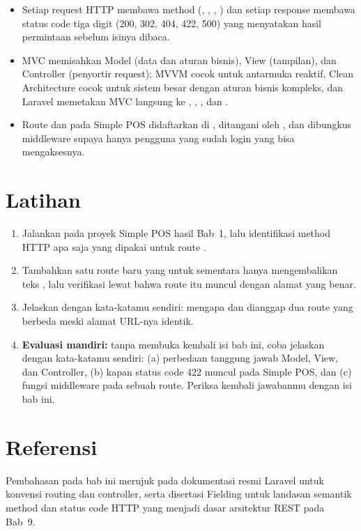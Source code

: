 \begin{itemize}
  \item Setiap request HTTP membawa method (, ,
    , ) dan setiap response membawa status code tiga
    digit (200, 302, 404, 422, 500) yang menyatakan hasil permintaan
    sebelum isinya dibaca.
  \item MVC memisahkan Model (data dan aturan bisnis), View (tampilan), dan
    Controller (penyortir request); MVVM cocok untuk antarmuka reaktif,
    Clean Architecture cocok untuk sistem besar dengan aturan bisnis
    kompleks, dan Laravel memetakan MVC langsung ke
    , , , dan
    .
  \item Route  dan  pada Simple POS
    didaftarkan di , ditangani oleh
    , dan dibungkus middleware 
    supaya hanya pengguna yang sudah login yang bisa mengaksesnya.
\end{itemize}

\section{Latihan}

\begin{enumerate}
  \item Jalankan  pada proyek Simple POS hasil Bab~1,
    lalu identifikasi method HTTP apa saja yang dipakai untuk route
    .
  \item Tambahkan satu route baru  yang untuk
    sementara hanya mengembalikan teks , lalu verifikasi lewat
     bahwa route itu muncul dengan alamat yang benar.
  \item Jelaskan dengan kata-katamu sendiri: mengapa  dan
     dianggap dua route yang berbeda meski alamat
    URL-nya identik.
  \item \textbf{Evaluasi mandiri:} tanpa membuka kembali isi bab ini, coba
    jelaskan dengan kata-katamu sendiri: (a) perbedaan tanggung jawab
    Model, View, dan Controller, (b) kapan status code 422 muncul pada
    Simple POS, dan (c) fungsi middleware  pada sebuah route.
    Periksa kembali jawabanmu dengan isi bab ini.
\end{enumerate}

\section{Referensi}

Pembahasan pada bab ini merujuk pada dokumentasi resmi Laravel
\cite{laraveldocs} untuk konvensi routing dan controller, serta disertasi
Fielding \cite{fielding2000rest} untuk landasan semantik method dan status
code HTTP yang menjadi dasar arsitektur REST pada Bab~9.
